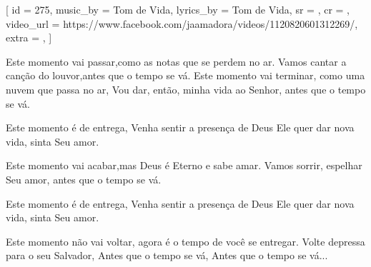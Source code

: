 [
    id          = {275},
    music_by    = {Tom de Vida},
    lyrics_by   = {Tom de Vida},
    sr          = {},
    cr          = {},
    video_url   = {https://www.facebook.com/jaamadora/videos/1120820601312269/},
    extra       = {},
]

\beginverse
Este momento vai passar,como as notas que se perdem no ar.
Vamos cantar a canção do louvor,antes que o tempo se vá.
Este momento vai terminar, como uma nuvem que passa no ar,
Vou dar, então, minha vida ao Senhor, antes que o tempo se vá.
\endverse

\beginchorus
Este momento é de entrega,
Venha sentir a presença de Deus
Ele quer dar nova vida, sinta Seu amor.
\endchorus

\beginverse
Este momento vai acabar,mas Deus é Eterno e sabe amar.
Vamos sorrir, espelhar Seu amor, antes que o tempo se vá.
\endverse

\beginchorus
Este momento é de entrega,
Venha sentir a presença de Deus
Ele quer dar nova vida, sinta Seu amor.
\endchorus

\beginverse
Este momento não vai voltar, agora é o tempo de você se entregar.
Volte depressa para o seu Salvador,
Antes que o tempo se vá,
Antes que o tempo se vá...
\endverse

\endsong
